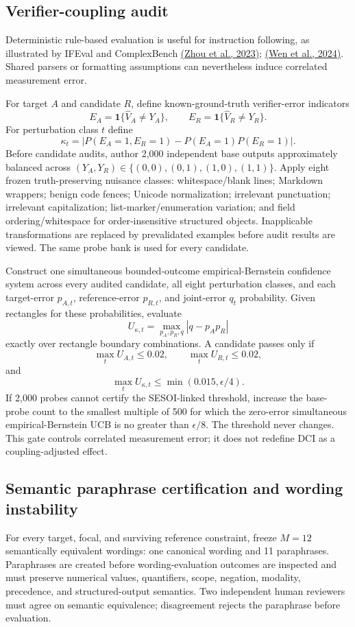 \documentclass[11pt,a4paper]{article}
\begin{document}
\subsection{Verifier-coupling audit}
Deterministic rule-based evaluation is useful for instruction following, as illustrated by IFEval and ComplexBench \href{https://arxiv.org/abs/2311.07911}{(Zhou et al., 2023)}; \href{https://arxiv.org/abs/2407.03978}{(Wen et al., 2024)}. Shared parsers or formatting assumptions can nevertheless induce correlated measurement error.

For target $A$ and candidate $R$, define known-ground-truth verifier-error indicators
\[
E_A=\mathbf1\{\widehat V_A\ne Y_A\},\qquad E_R=\mathbf1\{\widehat V_R\ne Y_R\}.
\]
For perturbation class $t$ define
\[
\kappa_t=\left|P(E_A=1,E_R=1)-P(E_A=1)P(E_R=1)\right|.
\]
Before candidate audits, author 2,000 independent base outputs approximately balanced across $(Y_A,Y_R)\in\{(0,0),(0,1),(1,0),(1,1)\}$. Apply eight frozen truth-preserving nuisance classes: whitespace/blank lines; Markdown wrappers; benign code fences; Unicode normalization; irrelevant punctuation; irrelevant capitalization; list-marker/enumeration variation; and field ordering/whitespace for order-insensitive structured objects. Inapplicable transformations are replaced by prevalidated examples before audit results are viewed. The same probe bank is used for every candidate.

Construct one simultaneous bounded-outcome empirical-Bernstein confidence system across every audited candidate, all eight perturbation classes, and each target-error $p_{A,t}$, reference-error $p_{R,t}$, and joint-error $q_t$ probability. Given rectangles for these probabilities, evaluate
\[
U_{\kappa,t}=\max_{p_A,p_R,q}|q-p_Ap_R|
\]
exactly over rectangle boundary combinations. A candidate passes only if
\[
\max_t U_{A,t}\le0.02,\qquad \max_t U_{R,t}\le0.02,
\]
and
\[
\boxed{\max_tU_{\kappa,t}\le\min(0.015,\epsilon/4).}
\]
If 2,000 probes cannot certify the SESOI-linked threshold, increase the base-probe count to the smallest multiple of 500 for which the zero-error simultaneous empirical-Bernstein UCB is no greater than $\epsilon/8$. The threshold never changes. This gate controls correlated measurement error; it does not redefine DCI as a coupling-adjusted effect.

\subsection{Semantic paraphrase certification and wording instability}
For every target, focal, and surviving reference constraint, freeze $M=12$ semantically equivalent wordings: one canonical wording and 11 paraphrases. Paraphrases are created before wording-evaluation outcomes are inspected and must preserve numerical values, quantifiers, scope, negation, modality, precedence, and structured-output semantics. Two independent human reviewers must agree on semantic equivalence; disagreement rejects the paraphrase before evaluation.
\end{document}

